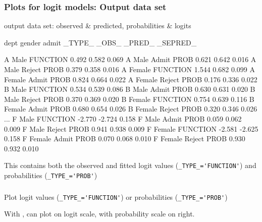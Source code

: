 \begin{frame}[fragile]
  \frametitle{Plots for logit models: Output data set}
 output data set: observed \& predicted, probabilities \& logits
\begin{Output}[gobble=0,baselinestretch=0.7,fontsize=\footnotesize]
dept    gender    admit     _TYPE_       _OBS_    _PRED_    _SEPRED_

 A      Male                FUNCTION     0.492     0.582      0.069 
 A      Male      Admit     PROB         0.621     0.642      0.016 
 A      Male      Reject    PROB         0.379     0.358      0.016 
 A      Female              FUNCTION     1.544     0.682      0.099 
 A      Female    Admit     PROB         0.824     0.664      0.022 
 A      Female    Reject    PROB         0.176     0.336      0.022 
 B      Male                FUNCTION     0.534     0.539      0.086 
 B      Male      Admit     PROB         0.630     0.631      0.020 
 B      Male      Reject    PROB         0.370     0.369      0.020 
 B      Female              FUNCTION     0.754     0.639      0.116 
 B      Female    Admit     PROB         0.680     0.654      0.026 
 B      Female    Reject    PROB         0.320     0.346      0.026
 ...
 F      Male                FUNCTION    -2.770    -2.724      0.158 
 F      Male      Admit     PROB         0.059     0.062      0.009 
 F      Male      Reject    PROB         0.941     0.938      0.009 
 F      Female              FUNCTION    -2.581    -2.625      0.158 
 F      Female    Admit     PROB         0.070     0.068      0.010 
 F      Female    Reject    PROB         0.930     0.932      0.010 
\end{Output}
This contains both the observed and fitted logit values (\verb|_TYPE_='FUNCTION'|)
and probabilities (\verb|_TYPE_='PROB'|)
\end{frame}

\begin{frame}[fragile]
\frametitle{}
\begin{itemize*}
  \item Plot logit values (\verb|_TYPE_='FUNCTION'|) or probabilities
  (\verb|_TYPE_='PROB'|)
  \item With , can plot on logit scale, with probability scale on
  right.
\end{itemize*}
\vspace{2ex}
\end{frame}

